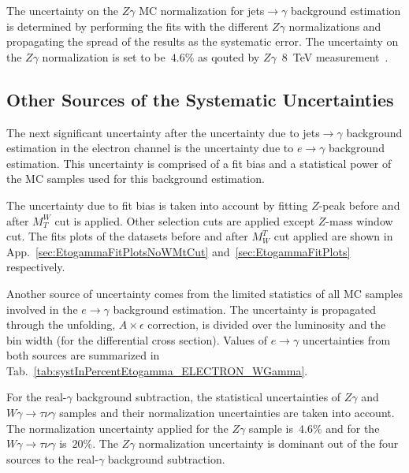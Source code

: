 The uncertainty on the $Z\gamma$ MC normalization for jets$\rightarrow\gamma$ background estimation is determined by performing the fits with the different $Z\gamma$ normalizations and propagating the spread of the results as the systematic error. The uncertainty on the $Z\gamma$ normalization is set to be~$4.6\%$ as qouted by $Z\gamma$~$8$~TeV measurement~\cite{ref_Zg8TeV}.

\subsection{Other Sources of the Systematic Uncertainties}
\label{sec:Systematics_OtherSources}

The next significant uncertainty after the uncertainty due to jets$\rightarrow\gamma$ background estimation in the electron channel is the uncertainty due to $e\rightarrow\gamma$ background estimation. This uncertainty is comprised of a fit bias and a statistical power of the MC samples used for this background estimation. 

The uncertainty due to fit bias is taken into account by fitting $Z$-peak before and after $M_T^W$ cut is applied. Other selection cuts are applied except $Z$-mass window cut. The fits plots of the datasets before and after $M_W^T$ cut applied are shown in App.~\ref{sec:EtogammaFitPlotsNoWMtCut} and~\ref{sec:EtogammaFitPlots} respectively.

Another source of uncertainty comes from the limited statistics of all MC samples involved in the $e\rightarrow\gamma$ background estimation. The uncertainty is propagated through the unfolding, $A \times \epsilon$ correction, is divided over the luminosity and the bin width (for the differential cross section). Values of $e\rightarrow\gamma$ uncertainties from both sources are summarized in Tab.~\ref{tab:systInPercentEtogamma_ELECTRON_WGamma}.


For the real-$\gamma$ background subtraction, the statistical uncertainties of $Z\gamma$ and $W\gamma\rightarrow\tau\nu\gamma$ samples and their normalization uncertainties are taken into account. The normalization uncertainty applied for the $Z\gamma$ sample is~$4.6\%$ and for the $W\gamma\rightarrow\tau\nu\gamma$ is~$20\%$. The $Z\gamma$ normalization uncertainty is dominant out of the four sources to the real-$\gamma$ background subtraction.



